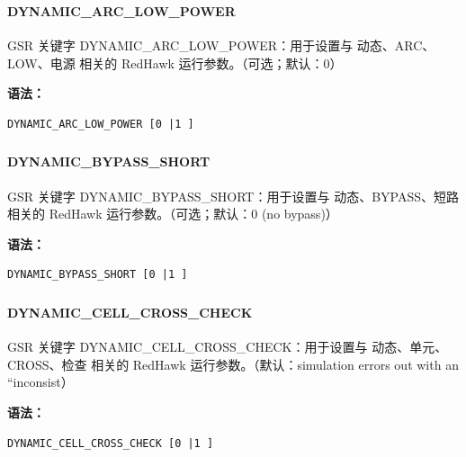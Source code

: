 \subsubsection{}
\paragraph*{DYNAMIC_ARC_LOW_POWER}

GSR 关键字 DYNAMIC_ARC_LOW_POWER：用于设置与 动态、ARC、LOW、电源 相关的 RedHawk 运行参数。（可选；默认：0）

\textbf{语法：}
\begin{lstlisting}
DYNAMIC_ARC_LOW_POWER [0 |1 ]
\end{lstlisting}

\subsubsection{}
\paragraph*{DYNAMIC_BYPASS_SHORT}

GSR 关键字 DYNAMIC_BYPASS_SHORT：用于设置与 动态、BYPASS、短路 相关的 RedHawk 运行参数。（可选；默认：0 (no bypass)）

\textbf{语法：}
\begin{lstlisting}
DYNAMIC_BYPASS_SHORT [0 |1 ]
\end{lstlisting}

\subsubsection{}
\paragraph*{DYNAMIC_CELL_CROSS_CHECK}

GSR 关键字 DYNAMIC_CELL_CROSS_CHECK：用于设置与 动态、单元、CROSS、检查 相关的 RedHawk 运行参数。（默认：simulation errors out with an “inconsist）

\textbf{语法：}
\begin{lstlisting}
DYNAMIC_CELL_CROSS_CHECK [0 |1 ]
\end{lstlisting}

\subsubsection{}
